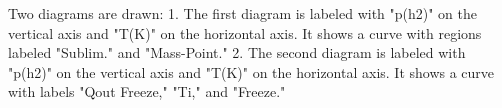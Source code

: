 Two diagrams are drawn:  
1. The first diagram is labeled with "p(h2)" on the vertical axis and "T(K)" on the horizontal axis. It shows a curve with regions labeled "Sublim." and "Mass-Point."  
2. The second diagram is labeled with "p(h2)" on the vertical axis and "T(K)" on the horizontal axis. It shows a curve with labels "Qout Freeze," "Ti," and "Freeze."